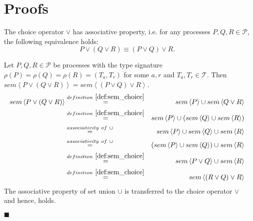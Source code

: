 \chapter{Proofs}
\begin{theorem}
\label{thm:associativity_choice}
The choice operator $\vee$ has associative property, i.e. for any processes $P, Q, R \in \mathcal{P}$, the following equivalence holds:
\begin{equation*}
  P \vee \left( Q \vee R \right) \equiv \left( P \vee Q \right) \vee R.
\end{equation*}
\end{theorem}

\begin{myproof}
Let $P, Q, R \in \mathcal{P}$ be processes with the type signature $\rho \left( P \right) = \rho \left( Q \right) = \rho \left( R \right) = \left( T_a, T_r \right)$ for some $a, r$ and $T_a, T_r \in \mathcal{T}$. Then $sem \left\langle P \vee \left( Q \vee R \right) \right\rangle = sem \left\langle \left( P \vee Q \right) \vee R \right\rangle$.
\begin{eqnarray*}
  sem \left\langle P \vee \left( Q \vee R \right) \right\rangle & \overset{\defref{def:sem_choice}}{=} & sem \left\langle P \right\rangle \cup sem \left\langle Q \vee R \right\rangle \\
  & \overset{\defref{def:sem_choice}}{=} & sem \left\langle P \right\rangle \cup \left( sem \left\langle Q \right\rangle \cup sem \left\langle R \right\rangle \right) \\
  & \overset{associativity \ of \ \cup}{=} & sem \left\langle P \right\rangle \cup sem \left\langle Q \right\rangle \cup sem \left\langle R \right\rangle \\
  & \overset{associativity \ of \ \cup}{=} & \left( sem \left\langle P \right\rangle \cup sem \left\langle Q \right\rangle \right) \cup sem \left\langle R \right\rangle \\
  & \overset{\defref{def:sem_choice}}{=} & sem \left\langle P \vee Q \right\rangle \cup sem \left\langle R \right\rangle \\
  & \overset{\defref{def:sem_choice}}{=} & sem \left\langle \left( R \vee Q \right) \vee R \right\rangle
\end{eqnarray*}
The associative property of set union $\cup$ is transferred to the choice operator $\vee$ and hence,  holds.

\hfill$\blacksquare$
\end{myproof}

